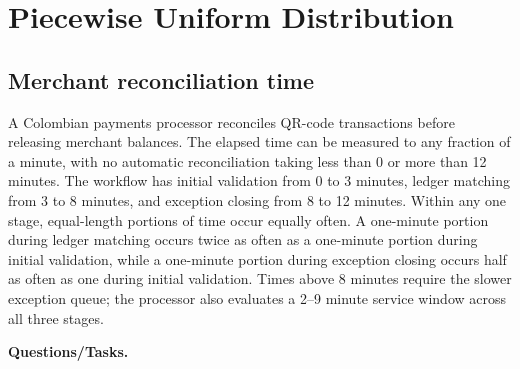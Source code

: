 \section{Piecewise Uniform Distribution}\label{sec:c2-piecewise-uniform-practice}

\subsection{Merchant reconciliation time}\label{sec:c2-piecewise-uniform-reconciliation}
A Colombian payments processor reconciles QR-code transactions before
releasing merchant balances.  The elapsed time can be measured to any fraction
of a minute, with no automatic reconciliation taking less than 0 or more than
12 minutes.  The workflow has initial validation from 0 to 3 minutes, ledger
matching from 3 to 8 minutes, and exception closing from 8 to 12 minutes.
Within any one stage, equal-length portions of time occur equally often.  A
one-minute portion during ledger matching occurs twice as often as a one-minute
portion during initial validation, while a one-minute portion during exception
closing occurs half as often as one during initial validation.  Times above 8
minutes require the slower exception queue; the processor also evaluates a
2--9 minute service window across all three stages.

\begingroup{}
\endgroup

\textbf{Questions/Tasks.}
\begin{enumerate}
\end{enumerate}

